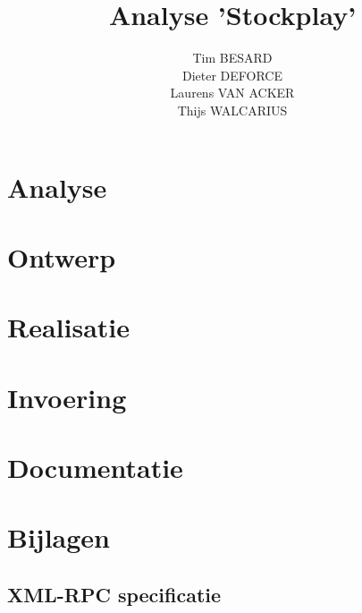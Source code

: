 \documentclass[a4paper,oneside]{report}
\title{Analyse 'Stockplay'}
\author{
Tim BESARD\\
Dieter DEFORCE\\
Laurens VAN ACKER\\
Thijs WALCARIUS
}
\begin{document}
\maketitle
{}
\tableofcontents
{}


%
%

\part{Analyse}


\part{Ontwerp}


\part{Realisatie}


\part{Invoering}


\part{Documentatie}


%
%

\part{Bijlagen}
\appendix

\chapter{XML-RPC specificatie}

\end{document}
